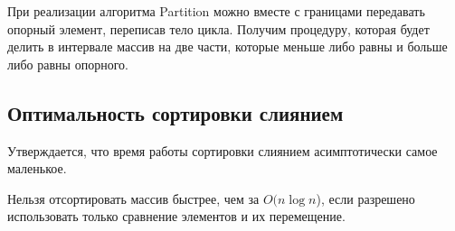 \documentclass[../book.tex]{subfiles}
\begin{document}
	
	\begin{remark}
		При реализации алгоритма Partition можно вместе с границами передавать опорный элемент, переписав тело цикла. Получим процедуру, которая будет делить в интервале массив на две части, которые меньше либо равны и больше либо равны опорного.
	\end{remark}
	
	\subsection{Оптимальность сортировки слиянием}
	
	Утверждается, что время работы сортировки слиянием асимптотически самое маленькое.
	
	\begin{theorem}
		Нельзя отсортировать массив быстрее, чем за $O(n \log n$), если разрешено использовать только сравнение элементов и их перемещение.
	\end{theorem}
	
\end{document}
